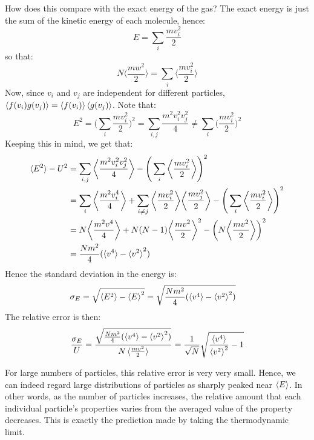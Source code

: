 \documentclass[a4paper,11pt,oneside]{book}
\begin{document}
How does this compare with the exact energy of the gas? The exact energy is just the sum of the kinetic energy of each molecule, hence:
\begin{equation}
    E= \sum_i \frac{mv_i^2}{2}
\end{equation}
so that:
\begin{equation}
    N \bigg \langle \frac{mw^2}{2} \bigg \rangle = \sum_i \bigg \langle \frac{mv_i^2}{2} \bigg \rangle
\end{equation}
Now, since $v_i$ and $v_j$ are independent for different particles, $\braket{f(v_i) g(v_j)} = \braket{f(v_i)}\braket{g(v_j)}$. Note that:
\begin{equation}
    E^2 = \bigg(\sum_{i} \frac{mv_i^2}{2}\bigg)^2 = \sum_{i,j} \frac{m^2v_i^2v_j^2}{4} \neq \sum_{i} \bigg(\frac{mv_i^2}{2}\bigg)^2
\end{equation}
Keeping this in mind, we get that:
\begin{align}
    \braket{E^2}-U^2 &= \sum_{i,j} \bigg \langle \frac{m^2v^2_i v^2_j}{4}\bigg \rangle  - \Bigg(\sum_i \bigg \langle \frac{mv_i^2}{2}\bigg \rangle \Bigg)^2\\
    &=\sum_i \bigg \langle \frac{m^2 v_i^4}{4}\bigg \rangle + \sum_{i \neq j} \bigg \langle \frac{mv_i^2}{2}\bigg \rangle \bigg \langle \frac{mv_j^2}{2}\bigg \rangle -  \Bigg(\sum_i \bigg \langle \frac{mv_i^2}{2}\bigg \rangle \Bigg)^2\\
    &= N \bigg \langle \frac{m^2 v^4}{4}\bigg \rangle + N(N-1)\bigg \langle \frac{m v^2}{2}\bigg \rangle^2 - \bigg(N\bigg \langle \frac{m v^2}{2}\bigg \rangle\bigg)^2\\
    &= \frac{Nm^2}{4}(\braket{v^4}-\braket{v^2}^2)
\end{align}
Hence the standard deviation in the energy is:
\begin{align}
    \sigma_E &= \sqrt{\braket{E^2}-\braket{E}^2} =\sqrt{ \frac{Nm^2}{4}(\braket{v^4}-\braket{v^2}^2)}
\end{align}
The relative error is then:
\begin{equation}
    \frac{\sigma_E}{U} = \frac{\sqrt{ \frac{Nm^2}{4}(\braket{v^4}-\braket{v^2}^2)}}{N \braket{\frac{mv^2}{2}}} = \frac{1}{\sqrt{N}}\sqrt{\frac{\braket{v^4}}{\braket{v^2}^2}-1}
\end{equation}

For large numbers of particles, this relative error is very very small. Hence, we can indeed regard large distributions of particles as sharply peaked near $\braket{E}$. In other words, as the number of particles increases, the relative amount that each individual particle's properties varies from the averaged value of the property decreases. This is exactly the prediction made by taking the thermodynamic limit. 
\end{document}
